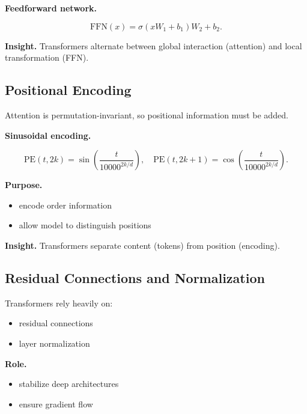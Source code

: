 \noindent
\textbf{Feedforward network.}

\[
\text{FFN}(x) = \sigma(xW_1 + b_1) W_2 + b_2.
\]

\medskip

\noindent
\textbf{Insight.}  
Transformers alternate between global interaction (attention) and local transformation (FFN).

\subsection{Positional Encoding}

Attention is permutation-invariant, so positional information must be added.

\medskip

\noindent
\textbf{Sinusoidal encoding.}

\[
\text{PE}(t, 2k) = \sin\left(\frac{t}{10000^{2k/d}}\right), \quad
\text{PE}(t, 2k+1) = \cos\left(\frac{t}{10000^{2k/d}}\right).
\]

\medskip

\noindent
\textbf{Purpose.}

\begin{itemize}
    \item encode order information
    \item allow model to distinguish positions
\end{itemize}

\medskip

\noindent
\textbf{Insight.}  
Transformers separate content (tokens) from position (encoding).

\subsection{Residual Connections and Normalization}

Transformers rely heavily on:

\begin{itemize}
    \item residual connections
    \item layer normalization
\end{itemize}

\medskip

\noindent
\textbf{Role.}

\begin{itemize}
    \item stabilize deep architectures
    \item ensure gradient flow
\end{itemize}

